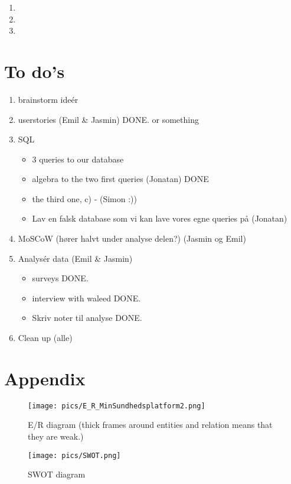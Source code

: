 \documentclass[a4paper,11pt]{article}
\begin{document}
\begin{enumerate}
    \item 
    
    \item
    
    \item
\end{enumerate}



\newpage
\section{To do's}
\begin{enumerate}
    \item brainstorm ideér
    \item userstories (Emil & Jasmin) DONE. or something
    \item SQL %
    \begin{itemize}
        \item 3 queries to our database
        \item algebra to the two first queries (Jonatan) DONE
        \item the third one, c) - (Simon :))
        \item Lav en falsk database som vi kan lave vores egne queries på (Jonatan)
    \end{itemize}{}
    \item MoSCoW (hører halvt under analyse delen?) (Jasmin og Emil)
    \item Analysér data (Emil \& Jasmin)
    \begin{itemize}
        \item surveys DONE.
        \item interview with waleed DONE.
        \item Skriv noter til analyse DONE.
    \end{itemize}
    \item Clean up (alle)
\end{enumerate}


\section{}
\section{Appendix}
\begin{figure}[H]
    \centering
    \texttt{[image: pics/E\_R\_MinSundhedsplatform2.png]}
    \caption{E/R diagram (thick frames around entities and relation means that they are weak.)}
    \label{fig:er}
\end{figure}

\begin{figure}[H]
    \centering
    \texttt{[image: pics/SWOT.png]}
    \caption{SWOT diagram}
    \label{fig:er}
\end{figure}
\end{document}
